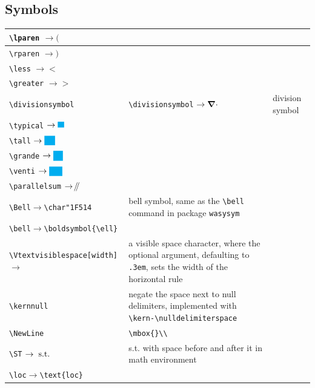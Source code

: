 \documentclass[a4paper,12pt]{article}
\begin{document}
\subsection{Symbols}
\begin{longtable}[c]{|p{}|p{}|}
\hline
\verb|\lparen| $\rightarrow\lparen$ \\\hline
\verb|\rparen| $\rightarrow\rparen$ \\\hline
\verb|\less| $\rightarrow\less$ \\\hline
\verb|\greater| $\rightarrow\greater$ \\\hline
\verb|\divisionsymbol| & \verb|\divisionsymbol| $\rightarrow \divisionsymbol$ & division symbol \\\hline
\verb|\typical| $\rightarrow \typical$ & \\\hline
\verb|\tall| $\rightarrow \tall$ & \\\hline
\verb|\grande| $\rightarrow \grande$ & \\\hline
\verb|\venti| $\rightarrow \venti$ & \\\hline
\verb|\parallelsum| $\rightarrow \parallelsum$ & \\\hline
\verb|\Bell|$\rightarrow$\verb|\char"1F514| & bell symbol, same as the \verb|\bell| command in package \verb|wasysym| \\\hline
\verb|\bell|$\rightarrow$\verb|\boldsymbol{\ell}| & \\\hline
\verb|\Vtextvisiblespace[width]| $\rightarrow$ \Vtextvisiblespace & a visible space character, where the optional argument, defaulting to \verb|.3em|, sets the width of the horizontal rule \\\hline
\verb|\kernnull| & negate the space next to null delimiters, implemented with \verb|\kern-\nulldelimiterspace| \\\hline
\verb|\NewLine| & \verb|\mbox{}\\|\\\hline
\verb|\ST| $\rightarrow \ST$ & s.t. with space before and after it in math environment \\\hline
\verb|\loc|$\rightarrow$\verb|\text{loc}| & \\\hline
\end{longtable}
\end{document}
